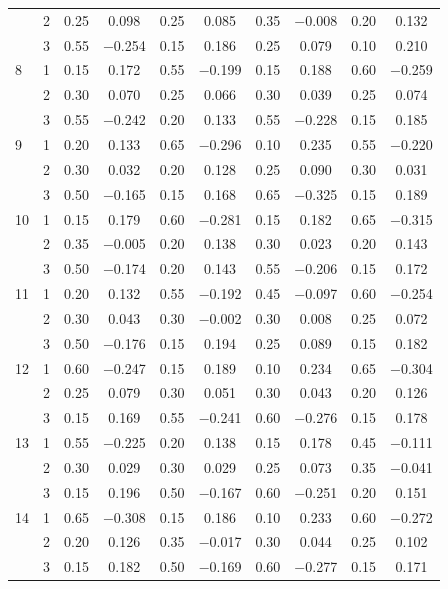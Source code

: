 \begin{longtable}{llcccccccc}
   & 2 & 0.25 & 0.098 & 0.25 & 0.085 & 0.35 & $-$0.008 & 0.20 & 0.132 \\ 
   & 3 & 0.55 & $-$0.254 & 0.15 & 0.186 & 0.25 & 0.079 & 0.10 & 0.210 \\ 
  8 & 1 & 0.15 & 0.172 & 0.55 & $-$0.199 & 0.15 & 0.188 & 0.60 & $-$0.259 \\ 
   & 2 & 0.30 & 0.070 & 0.25 & 0.066 & 0.30 & 0.039 & 0.25 & 0.074 \\ 
   & 3 & 0.55 & $-$0.242 & 0.20 & 0.133 & 0.55 & $-$0.228 & 0.15 & 0.185 \\ 
  9 & 1 & 0.20 & 0.133 & 0.65 & $-$0.296 & 0.10 & 0.235 & 0.55 & $-$0.220 \\ 
   & 2 & 0.30 & 0.032 & 0.20 & 0.128 & 0.25 & 0.090 & 0.30 & 0.031 \\ 
   & 3 & 0.50 & $-$0.165 & 0.15 & 0.168 & 0.65 & $-$0.325 & 0.15 & 0.189 \\ 
  10 & 1 & 0.15 & 0.179 & 0.60 & $-$0.281 & 0.15 & 0.182 & 0.65 & $-$0.315 \\ 
   & 2 & 0.35 & $-$0.005 & 0.20 & 0.138 & 0.30 & 0.023 & 0.20 & 0.143 \\ 
   & 3 & 0.50 & $-$0.174 & 0.20 & 0.143 & 0.55 & $-$0.206 & 0.15 & 0.172 \\ 
  11 & 1 & 0.20 & 0.132 & 0.55 & $-$0.192 & 0.45 & $-$0.097 & 0.60 & $-$0.254 \\ 
   & 2 & 0.30 & 0.043 & 0.30 & $-$0.002 & 0.30 & 0.008 & 0.25 & 0.072 \\ 
   & 3 & 0.50 & $-$0.176 & 0.15 & 0.194 & 0.25 & 0.089 & 0.15 & 0.182 \\ 
  12 & 1 & 0.60 & $-$0.247 & 0.15 & 0.189 & 0.10 & 0.234 & 0.65 & $-$0.304 \\ 
   & 2 & 0.25 & 0.079 & 0.30 & 0.051 & 0.30 & 0.043 & 0.20 & 0.126 \\ 
   & 3 & 0.15 & 0.169 & 0.55 & $-$0.241 & 0.60 & $-$0.276 & 0.15 & 0.178 \\ 
  13 & 1 & 0.55 & $-$0.225 & 0.20 & 0.138 & 0.15 & 0.178 & 0.45 & $-$0.111 \\ 
   & 2 & 0.30 & 0.029 & 0.30 & 0.029 & 0.25 & 0.073 & 0.35 & $-$0.041 \\ 
   & 3 & 0.15 & 0.196 & 0.50 & $-$0.167 & 0.60 & $-$0.251 & 0.20 & 0.151 \\ 
  14 & 1 & 0.65 & $-$0.308 & 0.15 & 0.186 & 0.10 & 0.233 & 0.60 & $-$0.272 \\ 
   & 2 & 0.20 & 0.126 & 0.35 & $-$0.017 & 0.30 & 0.044 & 0.25 & 0.102 \\ 
   & 3 & 0.15 & 0.182 & 0.50 & $-$0.169 & 0.60 & $-$0.277 & 0.15 & 0.171 \\ 

\end{longtable}

